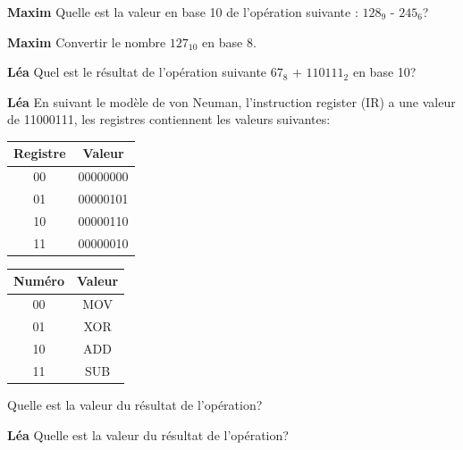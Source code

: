 \begin{Exercice}[10 minutes]\textbf{Maxim} Quelle est la valeur en base 10 de l’opération suivante : $128_9$ - $245_6$?
\end{Exercice}

\begin{Exercice}[10 minutes]\textbf{Maxim}
Convertir le nombre $127_{10}$ en base 8.
\end{Exercice}

\begin{Exercice}[10 minutes]\textbf{Léa}
Quel est le résultat de l'opération suivante $67_8$ + $110111_2$ en base 10? 
\end{Exercice}

\begin{Exercice}[10 minutes]\textbf{Léa}
En suivant le modèle de von Neuman, l'instruction register (IR) a une valeur de 11000111, les registres contiennent les valeurs suivantes:
\begin{table}[h!]
\centering
\begin{tabular}{|c|c|}
\hline
\textbf{Registre} & \textbf{Valeur} \\ \hline
00 & 00000000 \\ 
01 & 00000101 \\ 
10 & 00000110 \\ 
11 & 00000010 \\ \hline
\end{tabular}
\end{table}

\begin{center}
\begin{tabular}{|c|c|}
\hline
\textbf{Numéro} & \textbf{Valeur} \\ \hline
00 & MOV \\ 
01 & XOR \\ 
10 & ADD \\ 
11 & SUB \\ \hline
\end{tabular}
\end{center}
Quelle est la valeur du résultat de l'opération?
\end{Exercice}

\begin{Exercice}[10 minutes]\textbf{Léa}
Quelle est la valeur du résultat de l'opération?
\end{Exercice}

